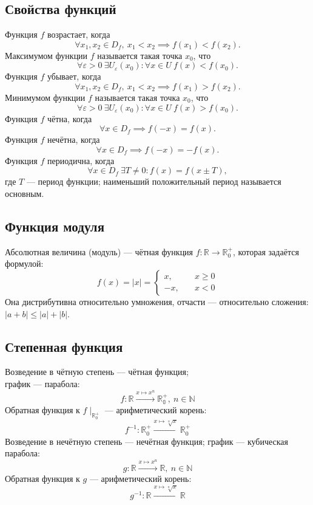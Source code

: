 \subsection{Свойства функций}

Функция $f$ {\ital возрастает}, когда
$$\forall x_1,x_2\in D_f,\ x_1\less x_2\implies f(x_1)\less f(x_2).$$
{\ital Максимумом} функции $f$ называется такая точка $x_0$, что
$$\forall\varepsilon\greater 0\ \exists U_\varepsilon(x_0)\colon\forall x\in U\ f(x)
\less f(x_0).$$
Функция $f$ {\ital убывает}, когда
$$\forall x_1,x_2\in D_f,\ x_1\less x_2\implies f(x_1)\greater f(x_2).$$
{\ital Минимумом} функции $f$ называется такая точка $x_0$, что
$$\forall\varepsilon\greater 0\ \exists U_\varepsilon(x_0)\colon\forall x\in U\ f(x)
\greater f(x_0).$$
Функция $f$ {\ital чётна}, когда
$$\forall x\in D_f\implies f(-x)=f(x).$$
Функция $f$ {\ital нечётна}, когда
$$\forall x\in D_f\implies f(-x)=-f(x).$$
Функция $f$ {\ital периодична}, когда
$$\forall x\in D_f\ \exists T\neq 0\colon f(x)=f(x\pm T),$$
где $T$ --- {\bold период} функции; наименьший положительный период называется
{\ital основным}.

\subsection{Функция модуля}

{\bold Абсолютная величина} {\ital (модуль)} --- чётная функция $f\colon\mathbb{R}
\to\mathbb{R}^+_0$, которая задаётся формулой:
$$f(x)=|x|=\begin{cases}x,\quad &x\geq 0\\-x,\quad &x\less 0\end{cases}$$
Она {\ital дистрибутивна} относительно умножения, отчасти --- относительно
сложения: $|a+b|\leq |a|+|b|$.

\subsection{Степенная функция}

{\bold Возведение в чётную степень} --- чётная функция;\\
график --- {\ital парабола}:\\[-10pt]
$$f\colon\mathbb{R}\xrightarrow{x\mapsto x^n}\mathbb{R^+_0},\ n\in\mathbb{N}$$
Обратная функция к $f\mid_{\mathbb{R}^+_0}$ --- {\bold арифметический корень}:\\[-3pt]
$$f^{-1}\colon\mathbb{R}^+_0\xrightarrow{x\mapsto\sqrt[n]{x}}\mathbb{R}^+_0$$
{\bold Возведение в нечётную степень} --- нечётная функция; график --- {\ital кубическая 
парабола}:
$$g\colon\mathbb{R}\xrightarrow{x\mapsto x^n}\mathbb{R},\ n\in\mathbb{N}$$
Обратная функция к $g$ --- {\bold арифметический корень}:
$$g^{-1}\colon\mathbb{R}\xrightarrow{x\mapsto\sqrt[n]{x}}\mathbb{R}$$

